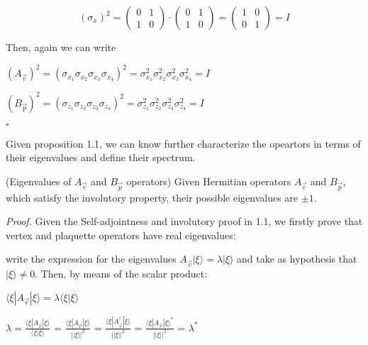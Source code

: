 \documentclass{Configuration_Files/PoliMi3i_thesis}
\begin{document}
\[
\text{$( \sigma_x )^{2}$} = 
\begin{pmatrix}
	0 & 1 \\
	1 & 0
\end{pmatrix} \cdot
\begin{pmatrix}
	0 & 1 \\
	1 & 0
\end{pmatrix} =
\begin{pmatrix}
	1 & 0 \\
	0 & 1
\end{pmatrix}
= \text{$I$}
\]\newline


Then, again we can write \newline

\begin{center}
	$(A_{\vec{v}})^{2} = (\sigma_{x_1} \sigma_{x_2} \sigma_{x_3} \sigma_{x_4})^{2} = \sigma_{x_1}^2 \sigma_{x_2}^2 \sigma_{x_3}^2 \sigma_{x_4}^2 = I$ 
	
	$(B_{\vec{p}})^{2} = (\sigma_{z_1} \sigma_{z_2} \sigma_{z_3} \sigma_{z_4})^{2} = \sigma_{z_1}^2 \sigma_{z_2}^2 \sigma_{z_3}^2 \sigma_{z_4}^2 = I$
\end{center}

\hfill $\square$

Given proposition 1.1, we can know further characterize the opeartors in terms of their eigenvalues and define their spectrum.

\begin{proposition} (Eigenvalues of $A_{\vec{v}}$ and $B_{\vec{p}}$ operators) Given Hermitian operators $A_{\vec{v}}$ and $B_{\vec{p}}$, which satisfy the involutory property, their possible eigenvalues are $\pm 1$.
\end{proposition}


\textit{Proof.}\newline
Given the Self-adjointness and involutory proof in 1.1, we firstly prove that vertex and plaquette operators have real eigenvalues: 

write the expression for the eigenvalues $A_{\vec{v}} |\xi \rangle = \lambda |\xi \rangle$ and take as hypothesis that $|\xi \rangle \neq 0$. Then, by means of the scalar product:

\begin{center}
	$\langle \xi|A_{\vec{v}}|\xi \rangle = \lambda \langle \xi | \xi \rangle$
	
	$\lambda = \frac {\langle \xi|A_{\vec{v}}|\xi \rangle}{\langle \xi |\xi \rangle}$ = $\frac {\langle \xi|A_{\vec{v}}|\xi \rangle}{||\xi||^2}$ = $\frac {\langle \xi|A_{\vec{v}}^{\dagger}|\xi \rangle}{||\xi||^2}$ = $\frac {\langle \xi|A_{\vec{v}}|\xi\rangle^*}{||\xi||^2}$ = $\lambda^*$ 
\end{center}
\end{document}
